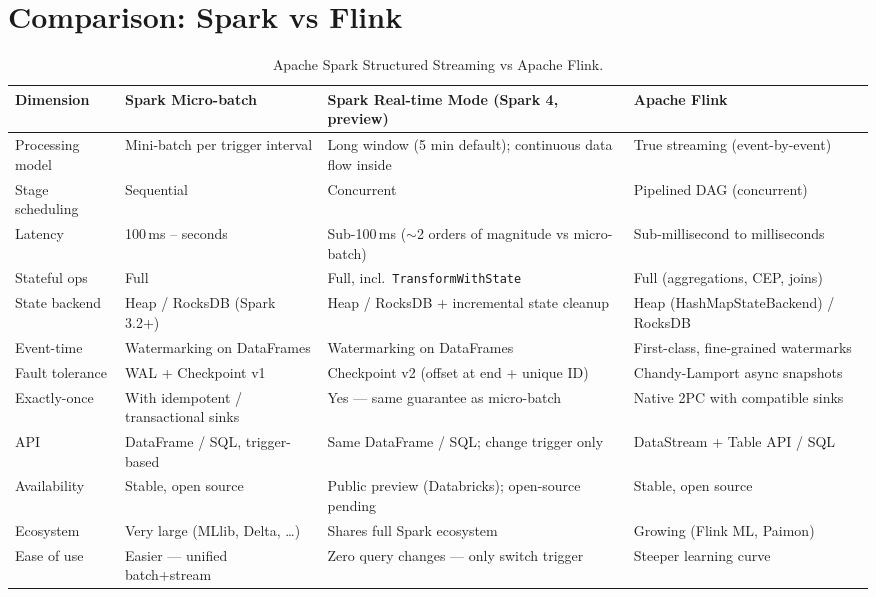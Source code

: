 \section{Comparison: Spark vs Flink}

\begin{table}[H]
  \centering
  \caption{Apache Spark Structured Streaming vs Apache Flink.}
  \label{tab:spark-vs-flink}
  \begin{tabularx}{\textwidth}{lXXX}
    \toprule
    \textbf{Dimension} & \textbf{Spark Micro-batch} & \textbf{Spark Real-time Mode (Spark 4, preview)} & \textbf{Apache Flink} \\
    \midrule
    Processing model  & Mini-batch per trigger interval        & Long window (5 min default); continuous data flow inside & True streaming (event-by-event) \\
    Stage scheduling  & Sequential                             & Concurrent                                               & Pipelined DAG (concurrent) \\
    Latency           & 100\,ms – seconds                      & Sub-100\,ms ($\sim$2 orders of magnitude vs micro-batch) & Sub-millisecond to milliseconds \\
    Stateful ops      & Full                                   & Full, incl.\ \texttt{TransformWithState}                 & Full (aggregations, CEP, joins) \\
    State backend     & Heap / RocksDB (Spark 3.2+)            & Heap / RocksDB + incremental state cleanup               & Heap (HashMapStateBackend) / RocksDB \\
    Event-time        & Watermarking on DataFrames             & Watermarking on DataFrames                               & First-class, fine-grained watermarks \\
    Fault tolerance   & WAL + Checkpoint v1                    & Checkpoint v2 (offset at end + unique ID)                & Chandy-Lamport async snapshots \\
    Exactly-once      & With idempotent / transactional sinks  & Yes — same guarantee as micro-batch                      & Native 2PC with compatible sinks \\
    API               & DataFrame / SQL, trigger-based         & Same DataFrame / SQL; change trigger only                & DataStream + Table API / SQL \\
    Availability      & Stable, open source                    & Public preview (Databricks); open-source pending         & Stable, open source \\
    Ecosystem         & Very large (MLlib, Delta, …)           & Shares full Spark ecosystem                              & Growing (Flink ML, Paimon) \\
    Ease of use       & Easier — unified batch+stream          & Zero query changes — only switch trigger                 & Steeper learning curve \\
    \bottomrule
  \end{tabularx}
\end{table}
